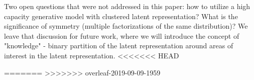 Two open questions that were not addressed in this paper: how to utilize a high capacity generative model with clustered latent representation? What is the significance of symmetry (multiple factorizations of the same distribution)? We leave that discussion for future work, where we will introduce the concept of "knowledge" - binary partition of the latent representation around areas of interest in the latent representation.
<<<<<<< HEAD

=======
>>>>>>> overleaf-2019-09-09-1959
